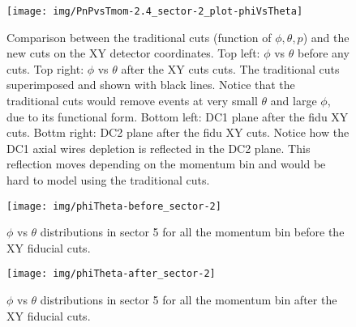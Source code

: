 \begin{figure}[ht]
    \centering
    \texttt{[image: img/PnPvsTmom-2.4\_sector-2\_plot-phiVsTheta]}
    \caption{Comparison between the traditional cuts (function of $\phi, \theta, p$) and the new cuts on the XY detector coordinates.
    Top left:  $\phi$ vs $\theta$ before any cuts. Top right:  $\phi$ vs $\theta$ after the XY cuts cuts. The traditional cuts superimposed
    and shown with black lines. Notice that the traditional cuts would remove events at very small $\theta$ and large $\phi$, due to its functional form.
    Bottom left: DC1 plane after the fidu XY cuts. Bottm right: DC2 plane after the fidu XY cuts.
    Notice how the DC1 axial wires depletion is reflected in the DC2 plane. This reflection moves depending on the momentum bin and would be hard to model
    using the traditional cuts.}
    \label{fig:PnPvsTmom-2.4_sector-2_plot-phiVsTheta}
\end{figure}




\begin{figure}[ht]
    \centering
    \texttt{[image: img/phiTheta-before\_sector-2]}
    \caption{$\phi$ vs $\theta$ distributions in sector 5 for all the momentum bin before the XY fiducial cuts.}
    \label{fig:phiTheta-before_sector-5}
\end{figure}

\begin{figure}[ht]
    \centering
    \texttt{[image: img/phiTheta-after\_sector-2]}
    \caption{$\phi$ vs $\theta$ distributions in sector 5 for all the momentum bin after the XY fiducial cuts.}
    \label{fig:phiTheta-after_sector-5}
\end{figure}




